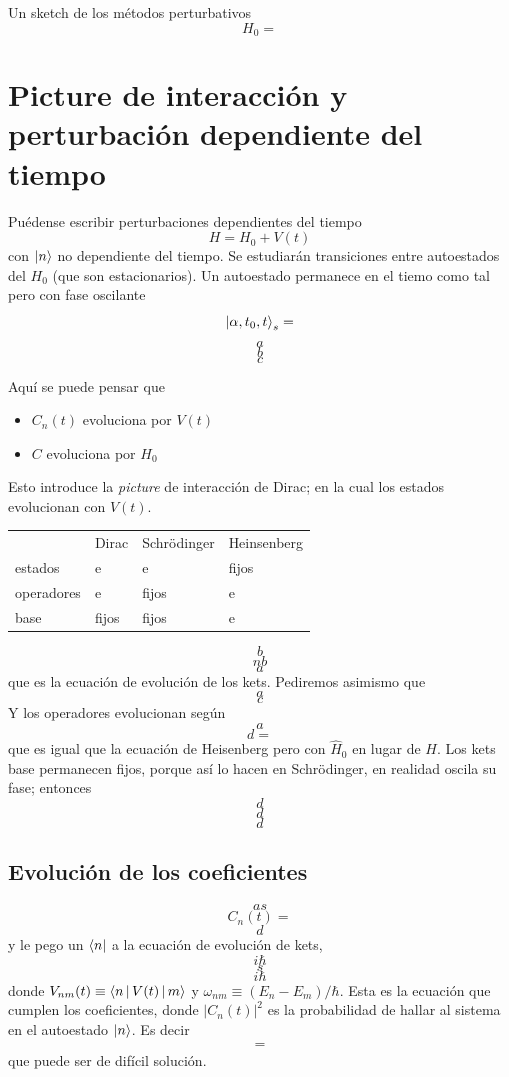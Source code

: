 \documentclass[10pt,oneside]{CBFT_book}
\begin{document}
Un sketch de los métodos perturbativos
\[
	H_0 = 
\]


\section{Picture de interacción y perturbación dependiente del tiempo}

Puédense escribir perturbaciones dependientes del tiempo 
\[
	H = H_0 + V(t)
\]
con $\Ket{n}$ no dependiente del tiempo. Se estudiarán transiciones entre autoestados del $H_0$ (que son 
estacionarios). Un autoestado permanece en el tiemo como tal pero con fase oscilante
\[
	\Ket{\alpha,t_0,t}_s = 
\]
\[
	a
\]
\[
	b
\]
\[
	c
\]

Aquí se puede pensar que 
\begin{itemize}
 \item $C_n(t)$ evoluciona por $V(t)$
 \item $C$ evoluciona por $H_0$
\end{itemize}

Esto introduce la {\it picture} de interacción de Dirac; en la cual los estados evolucionan con $V(t)$.

\begin{center}
\begin{tabular}{llll}
 & Dirac & Schrödinger & Heinsenberg \\
estados & e & e & fijos \\
operadores & e & fijos & e\\
base & fijos & fijos & e
\end{tabular}
\end{center}

\[
	b
\]
\[
	nb
\]
\[
	a
\]
que es la ecuación de evolución de los kets.
Pediremos asimismo que 
\[
	a
\]
\[
	c
\]
Y los operadores evolucionan según 
\[
	a
\]
\[
	d =
\]
que es igual que la ecuación de Heisenberg pero con $\hat{H}_0$ en lugar de $H$.
Los kets base permanecen fijos, porque así lo hacen en Schrödinger, en realidad oscila su fase; entonces 
\[
	d
\]
\[
	d
\]
\[
	d
\]

\subsection{Evolución de los coeficientes}

\[
	as
\]
\[
	C_n(t) =
\]
\[
	d
\]
y le pego un $\Bra{n}$ a la ecuación de evolución de kets,
\[
	i\hbar
\]
\[
	s
\]
\[
	i\hbar
\]
donde $V_{nm}(t) \equiv \Braket{n|V(t)|m}$ y $\omega_{nm} \equiv (E_n-E_m)/\hbar$.
Esta es la ecuación que cumplen los coeficientes, donde $|C_n(t)|^2$ es la probabilidad de hallar al sistema 
en el autoestado $\Ket{n}$.
Es decir
\[
	\begin{matrix}
	 =
	\end{matrix}
\]
que puede ser de difícil solución.
\end{document}
